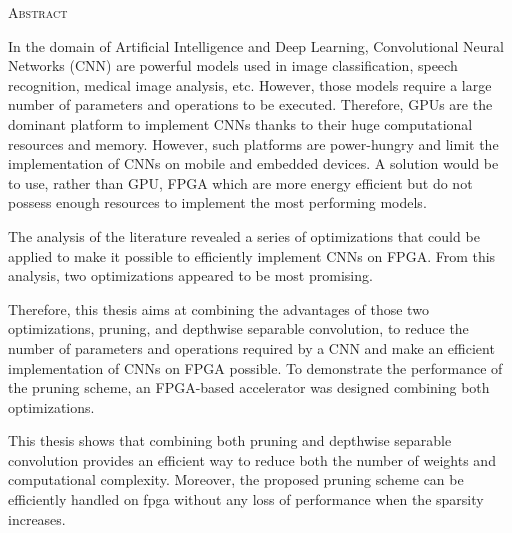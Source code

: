 \vspace*{\fill}

    \begin{center}
    \huge{\textsc{Abstract}}
    \end{center}
    
    In the domain of Artificial Intelligence and Deep Learning, Convolutional Neural Networks (CNN) are powerful models used in image classification, speech recognition, medical image analysis, etc. However, those models require a large number of parameters and operations to be executed. Therefore, GPUs are the dominant platform to implement CNNs thanks to their huge computational resources and memory. However, such platforms are power-hungry and limit the implementation of CNNs on mobile and embedded devices. A solution would be to use, rather than GPU, FPGA which are more energy efficient but do not possess enough resources to implement the most performing models. 
    
    The analysis of the literature revealed a series of optimizations that could be applied to make it possible to efficiently implement CNNs on FPGA. From this analysis, two optimizations appeared to be most promising.

    Therefore, this thesis aims at combining the advantages of those two optimizations, pruning, and depthwise separable convolution, to reduce the number of parameters and operations required by a CNN and make an efficient implementation of CNNs on FPGA possible. To demonstrate the performance of the pruning scheme, an FPGA-based accelerator was designed combining both optimizations.
    

    This thesis shows that combining both pruning and depthwise separable convolution provides an efficient way to reduce both the number of weights and computational complexity. Moreover, the proposed pruning scheme can be efficiently handled on \acrshort{fpga} without any loss of performance when the sparsity increases.

\vspace*{\fill}
\afterpage{\blankpage}
\newpage
